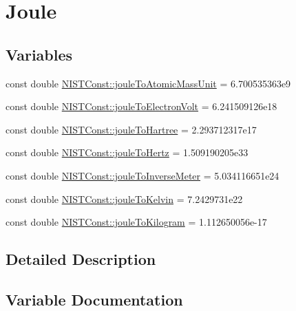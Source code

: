 \hypertarget{group___n_i_s_t_const-_joule}{}\section{Joule}
\label{group___n_i_s_t_const-_joule}
\subsection*{Variables}
\begin{DoxyCompactItemize}
\item 
const double \hyperlink{group___n_i_s_t_const-_joule_ga6a8cba6b834ee62ab61671208b1ae9ee}{N\+I\+S\+T\+Const\+::joule\+To\+Atomic\+Mass\+Unit} = 6.\+700535363e9
\item 
const double \hyperlink{group___n_i_s_t_const-_joule_ga08ffcdfd701ba898a91b0cbdde4d0e2d}{N\+I\+S\+T\+Const\+::joule\+To\+Electron\+Volt} = 6.\+241509126e18
\item 
const double \hyperlink{group___n_i_s_t_const-_joule_gac067d2d31bf56c3abe63559dac6c00d7}{N\+I\+S\+T\+Const\+::joule\+To\+Hartree} = 2.\+293712317e17
\item 
const double \hyperlink{group___n_i_s_t_const-_joule_ga6ac361417bc6b472bf80fcfef276d742}{N\+I\+S\+T\+Const\+::joule\+To\+Hertz} = 1.\+509190205e33
\item 
const double \hyperlink{group___n_i_s_t_const-_joule_gaa8de9ad07a642c1b9c1d4ee15125a917}{N\+I\+S\+T\+Const\+::joule\+To\+Inverse\+Meter} = 5.\+034116651e24
\item 
const double \hyperlink{group___n_i_s_t_const-_joule_ga506f23a4b88678bd7ee6f1067e97aa83}{N\+I\+S\+T\+Const\+::joule\+To\+Kelvin} = 7.\+2429731e22
\item 
const double \hyperlink{group___n_i_s_t_const-_joule_ga250f161277a6e581e695dccb7c11d1fb}{N\+I\+S\+T\+Const\+::joule\+To\+Kilogram} = 1.\+112650056e-\/17
\end{DoxyCompactItemize}


\subsection{Detailed Description}


\subsection{Variable Documentation}
\mbox{\label{group___n_i_s_t_const-_joule_ga6a8cba6b834ee62ab61671208b1ae9ee}} 
